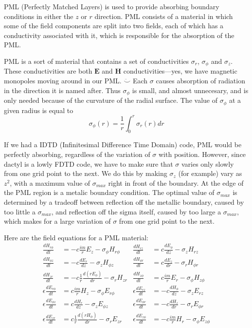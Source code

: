 \documentclass[floats]{report}
\begin{document}
PML (Perfectly Matched Layers) is used to provide absorbing boundary
conditions in either the $z$ or $r$ direction.  PML consists of a material
in which some of the field components are split into two fields, each of
which has a conductivity associated with it, which is responsible for the
absorption of the PML.

PML is a sort of material that contains a set of conductivities $\sigma_r$,
$\sigma_\phi$ and $\sigma_z$.  These conductivities are both $\mathbf{E}$
and $\mathbf{H}$ conductivities---yes, we have magnetic monopoles moving
around in our PML.  $\ddot\smile$ Each $\sigma$ causes absorption of
radiation in the direction it is named after.  Thus $\sigma_\phi$ is small,
and almost unnecesary, and is only needed because of the curvature of the
radial surface.  The value of $\sigma_\phi$ at a given radius is equal to
\begin{equation}
\sigma_\phi(r) = \frac1r \int_0^r \sigma_r(r)dr
\end{equation}

If we had a IDTD (Infinitesimal Difference Time Domain) code, PML would be
perfectly absorbing, regardless of the variation of $\sigma$ with position.
However, since dactyl is a lowly FDTD code, we have to make sure that
$\sigma$ varies only slowly from one grid point to the next.  We do this by
making $\sigma_z$ (for example) vary as $z^2$, with a maximum value of
$\sigma_{max}$ right in front of the boundary.  At the edge of the PML
region is a metalic boundary condition.  The optimal value of
$\sigma_{max}$ is determined by a tradeoff between reflection off the
metallic boundary, caused by too little a $\sigma_{max}$, and reflection
off the sigma itself, caused by too large a $\sigma_{max}$, which makes for
a large variation of $\sigma$ from one grid point to the next.

Here are the field equations for a PML material:
\begin{align}
\frac{dH_{r\phi}}{dt} &= - c \frac{im}r E_z             - \sigma_\phi H_{r\phi} &
\frac{dH_{rz}}{dt} &= c \frac{dE_\phi}{dz}              - \sigma_z H_{rz}\\
\frac{dH_{\phi z}}{dt} &= - c \frac{dE_r}{dz}           - \sigma_z H_{\phi z} &
\frac{dH_{\phi r}}{dt} &= c \frac{dE_z}{dr}             - \sigma_r H_{\phi r} \\
\frac{dH_{zr}}{dt} &= - c \frac1r\frac{d(rE_\phi)}{dr}  - \sigma_r H_{zr}  &
\frac{dH_{z\phi}}{dt} &= c \frac{im}r E_r               - \sigma_\phi H_{z\phi} \\
\epsilon\frac{dE_{r\phi}}{dt} &=   c \frac{im}r H_z             - \sigma_\phi E_{r\phi} &
\epsilon\frac{dE_{rz}}{dt} &= -c\frac{dH_\phi}{dz}              - \sigma_z E_{rz}\\
\epsilon\frac{dE_{\phi z}}{dt} &=   c \frac{dH_r}{dz}           - \sigma_z E_{\phi z} &
\epsilon\frac{dE_{\phi r}}{dt} &=-c \frac{dH_z}{dr}             - \sigma_r E_{\phi r} \\
\epsilon\frac{dE_{zr}}{dt} &=   c \frac1r\frac{d(rH_\phi)}{dr}  - \sigma_r E_{zr}  &
\epsilon\frac{dE_{z\phi}}{dt} &=-c \frac{im}r H_r               - \sigma_\phi E_{z\phi} 
\end{align}

\appendix


\end{document}
